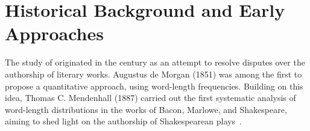 \section{Historical Background and Early Approaches}

The study of \ai{} originated in the  century as an attempt to resolve disputes over the authorship of literary works. 
Augustus de Morgan (1851) was among the first to propose a quantitative approach, using word-length frequencies. 
Building on this idea, Thomas C. Mendenhall (1887) carried out the first systematic analysis of word-length distributions in the works of Bacon, Marlowe, and Shakespeare, aiming to shed light on the authorship of Shakespearean plays~\citep{neal_surveying_2018,stamatatos_survey_2009}.

